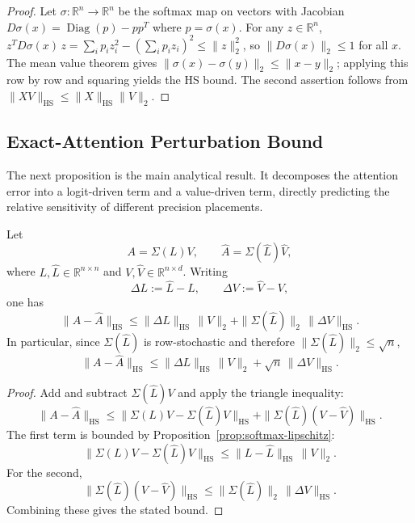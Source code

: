 \begin{proof}
    Let $\sigma : \mathbb{R}^n \to \mathbb{R}^n$ be the softmax map on vectors with Jacobian $D\sigma(x) = \operatorname{Diag}(p) - pp^T$ where $p = \sigma(x)$. For any $z \in \mathbb{R}^n$, $z^T D\sigma(x)\,z = \sum_i p_i z_i^2 - (\sum_i p_i z_i)^2 \leq \|z\|_2^2$, so $\|D\sigma(x)\|_2 \leq 1$ for all $x$. The mean value theorem gives $\|\sigma(x)-\sigma(y)\|_2 \leq \|x-y\|_2$; applying this row by row and squaring yields the HS bound. The second assertion follows from $\|XV\|_{\mathrm{HS}} \leq \|X\|_{\mathrm{HS}}\|V\|_2$.
\end{proof}

\subsection{Exact-Attention Perturbation Bound}

The next proposition is the main analytical result. It decomposes the attention error into a logit-driven term and a value-driven term, directly predicting the relative sensitivity of different precision placements.

\begin{proposition}
    \label{prop:local-perturbation}
    Let
    \[
        A = \Sigma(L)V,
        \qquad
        \widehat{A} = \Sigma(\widehat{L})\widehat{V},
    \]
    where $L, \widehat{L} \in \mathbb{R}^{n \times n}$ and $V, \widehat{V} \in \mathbb{R}^{n \times d}$. Writing
    \[
        \Delta L := \widehat{L} - L,
        \qquad
        \Delta V := \widehat{V} - V,
    \]
    one has
    \[
        \|A - \widehat{A}\|_{\mathrm{HS}}
        \leq
        \|\Delta L\|_{\mathrm{HS}}\,\|V\|_2
        +
        \|\Sigma(\widehat{L})\|_2\,\|\Delta V\|_{\mathrm{HS}}.
    \]
    In particular, since $\Sigma(\widehat{L})$ is row-stochastic and therefore $\|\Sigma(\widehat{L})\|_2 \leq \sqrt{n}$,
    \[
        \|A - \widehat{A}\|_{\mathrm{HS}}
        \leq
        \|\Delta L\|_{\mathrm{HS}}\,\|V\|_2
        +
        \sqrt{n}\,\|\Delta V\|_{\mathrm{HS}}.
    \]
\end{proposition}

\begin{proof}
    Add and subtract $\Sigma(\widehat{L})V$ and apply the triangle inequality:
    \[
        \|A-\widehat{A}\|_{\mathrm{HS}}
        \leq
        \|\Sigma(L)V-\Sigma(\widehat{L})V\|_{\mathrm{HS}}
        +
        \|\Sigma(\widehat{L})(V-\widehat{V})\|_{\mathrm{HS}}.
    \]
    The first term is bounded by Proposition~\ref{prop:softmax-lipschitz}:
    \[
        \|\Sigma(L)V-\Sigma(\widehat{L})V\|_{\mathrm{HS}}
        \leq
        \|L-\widehat{L}\|_{\mathrm{HS}}\,\|V\|_2.
    \]
    For the second,
    \[
        \|\Sigma(\widehat{L})(V-\widehat{V})\|_{\mathrm{HS}}
        \leq
        \|\Sigma(\widehat{L})\|_2\,\|\Delta V\|_{\mathrm{HS}}.
    \]
    Combining these gives the stated bound.
\end{proof}

